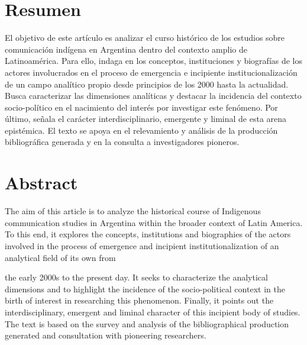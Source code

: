 \documentclass{tufte-handout}
\begin{document}
\begin{titlepage}
\vspace*{1em}


\hypertarget{resumen}{%
\section{Resumen}\label{resumen}}

El objetivo de este artículo es analizar el curso histórico de los
estudios sobre comunicación indígena en Argentina dentro del contexto
amplio de Latinoamérica. Para ello, indaga en los conceptos,
instituciones y biografías de los actores involucrados en el proceso de
emergencia e incipiente institucionalización de un campo analítico
propio desde principios de los 2000 hasta la actualidad. Busca
caracterizar las dimensiones analíticas y destacar la incidencia del
contexto socio-político en el nacimiento del interés por investigar este
fenómeno. Por último, señala el carácter interdisciplinario, emergente y
liminal de esta arena epistémica. El texto se apoya en el relevamiento y
análisis de la producción bibliográfica generada y en la consulta a
investigadores pioneros.

\hypertarget{abstract}{%
\section{Abstract}\label{abstract}}

The aim of this article is to analyze the historical course of
Indigenous communication studies in Argentina within the broader context
of Latin America. To this end, it explores the concepts, institutions
and biographies of the actors involved in the process of emergence and
incipient institutionalization of an analytical field of its own from


\vspace*{3em}


\pagebreak\noindent the early 2000s to the present day. It seeks to characterize the
analytical dimensions and to highlight the incidence of the
socio-political context in the birth of interest in researching this
phenomenon. Finally, it points out the interdisciplinary, emergent and
liminal character of this incipient body of studies. The text is based
on the survey and analysis of the bibliographical production generated
and consultation with pioneering researchers.

\enlargethispage{2\baselineskip}



\end{titlepage}
\end{document}
